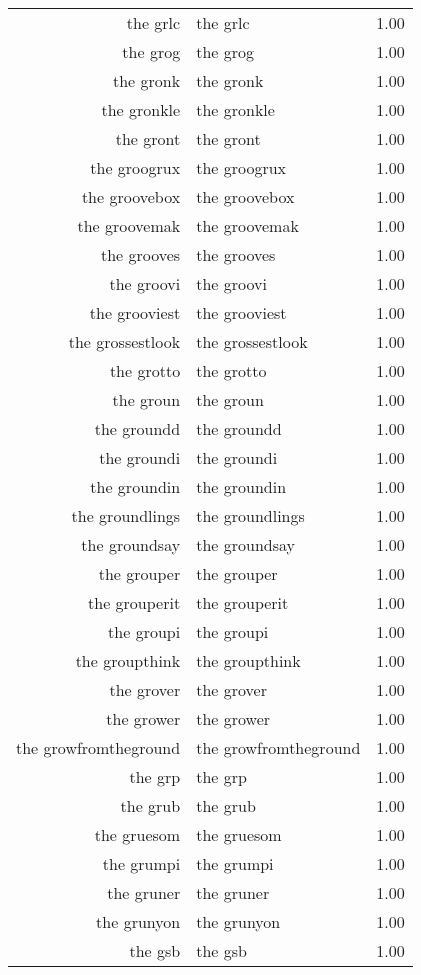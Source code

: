 \begin{table}[ht]
\begin{tabular}{rlr}
  the grlc & the grlc & 1.00 \\ 
  the grog & the grog & 1.00 \\ 
  the gronk & the gronk & 1.00 \\ 
  the gronkle & the gronkle & 1.00 \\ 
  the gront & the gront & 1.00 \\ 
  the groogrux & the groogrux & 1.00 \\ 
  the groovebox & the groovebox & 1.00 \\ 
  the groovemak & the groovemak & 1.00 \\ 
  the grooves & the grooves & 1.00 \\ 
  the groovi & the groovi & 1.00 \\ 
  the grooviest & the grooviest & 1.00 \\ 
  the grossestlook & the grossestlook & 1.00 \\ 
  the grotto & the grotto & 1.00 \\ 
  the groun & the groun & 1.00 \\ 
  the groundd & the groundd & 1.00 \\ 
  the groundi & the groundi & 1.00 \\ 
  the groundin & the groundin & 1.00 \\ 
  the groundlings & the groundlings & 1.00 \\ 
  the groundsay & the groundsay & 1.00 \\ 
  the grouper & the grouper & 1.00 \\ 
  the grouperit & the grouperit & 1.00 \\ 
  the groupi & the groupi & 1.00 \\ 
  the groupthink & the groupthink & 1.00 \\ 
  the grover & the grover & 1.00 \\ 
  the grower & the grower & 1.00 \\ 
  the growfromtheground & the growfromtheground & 1.00 \\ 
  the grp & the grp & 1.00 \\ 
  the grub & the grub & 1.00 \\ 
  the gruesom & the gruesom & 1.00 \\ 
  the grumpi & the grumpi & 1.00 \\ 
  the gruner & the gruner & 1.00 \\ 
  the grunyon & the grunyon & 1.00 \\ 
  the gsb & the gsb & 1.00 \\ 

\end{tabular}
\end{table}
